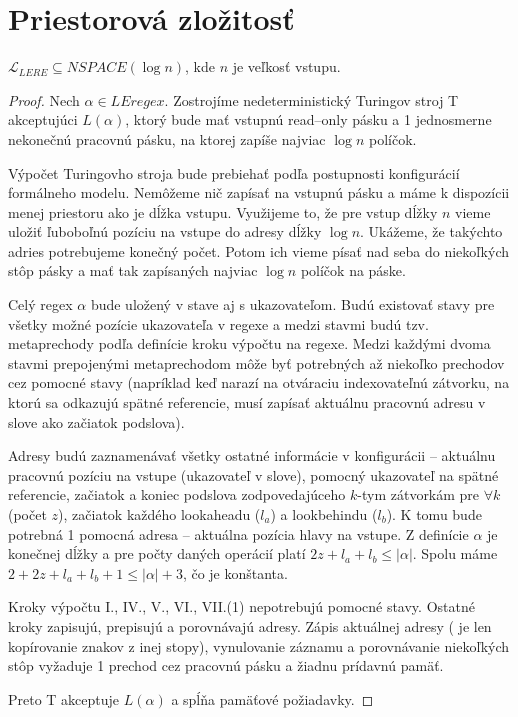 \documentclass{svk_long_sk}
\def\le{LEregex}
\def\lel{\mathscr{L}_{LERE}}
\begin{document}
\section{Priestorová zložitosť}
\begin{theorem}\label{lere_nspace(logn)}
$\lel \subseteq NSPACE(\log n)$, kde $n$ je veľkosť vstupu.
\end{theorem}
\begin{proof}
Nech $\alpha\in\le$. Zostrojíme nedeterministický Turingov stroj T akceptujúci $L(\alpha)$, ktorý bude mať vstupnú read--only pásku a 1 jednosmerne nekonečnú pracovnú pásku, na ktorej zapíše najviac $\log n$ políčok.

Výpočet Turingovho stroja bude prebiehať podľa postupnosti konfigurácií formálneho modelu. Nemôžeme nič zapísať na vstupnú pásku a máme k dispozícii menej priestoru ako je dĺžka vstupu. Využijeme to, že pre vstup dĺžky $n$ vieme uložiť ľuboboľnú pozíciu na vstupe do adresy dĺžky $\log n$. Ukážeme, že takýchto adries potrebujeme konečný počet. Potom ich vieme písať nad seba do niekoľkých stôp pásky a mať tak zapísaných najviac $\log n$ políčok na páske.

Celý regex $\alpha$ bude uložený v stave aj s ukazovateľom. Budú existovať stavy pre všetky možné pozície ukazovateľa v regexe a medzi stavmi budú tzv. metaprechody podľa definície kroku výpočtu na regexe. Medzi každými dvoma stavmi prepojenými metaprechodom môže byť potrebných až niekoľko prechodov cez pomocné stavy (napríklad keď narazí na otváraciu indexovateľnú zátvorku, na ktorú sa odkazujú spätné referencie, musí zapísať aktuálnu pracovnú adresu v slove ako začiatok podslova).

Adresy budú zaznamenávať všetky ostatné informácie v konfigurácii -- aktuálnu pracovnú pozíciu na vstupe (ukazovateľ v slove), pomocný ukazovateľ na spätné referencie, začiatok a koniec podslova zodpovedajúceho $k$-tym zátvorkám pre $\forall k$ (počet $z$), začiatok každého lookaheadu ($l_a$) a look\-be\-hindu ($l_b$). K tomu bude potrebná 1 pomocná adresa -- aktuálna pozícia hlavy na vstupe. Z definície $\alpha$ je konečnej dĺžky a pre počty daných operácií platí $2z+l_a+l_b \leq |\alpha|$. Spolu máme $2+2z+l_a+l_b+1 \leq |\alpha|+3$, čo je konštanta. 

Kroky výpočtu I., IV., V., VI., VII.(1) nepotrebujú pomocné stavy. Ostatné kroky zapisujú, prepisujú a porovnávajú adresy. Zápis aktuálnej adresy ( je len kopírovanie znakov z inej stopy), vynulovanie záznamu a porovnávanie niekoľkých stôp vyžaduje 1 prechod cez pracovnú pásku a žiadnu prídavnú pamäť.

Preto T akceptuje $L(\alpha)$ a spĺňa pamäťové požiadavky.
\end{proof}
\end{document}
